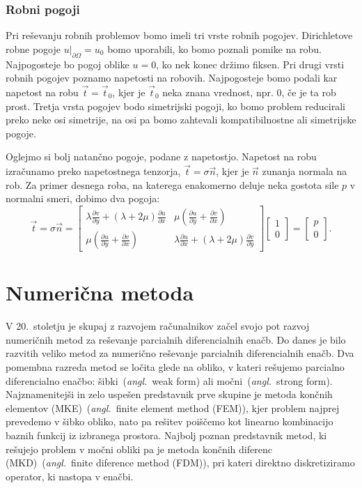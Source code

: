 \documentclass[12pt,a4paper,twoside]{article}
\theoremstyle{definition} %
\theoremstyle{plain} %
\numberwithin{equation}{section}
\newcommand{\dpar}[2]{\ensuremath{\frac{\partial #1}{\partial #2}}}
\newcommand{\vt}{\vec{t}}
\newcommand{\vn}{\vec{n}}
\newcommand{\ts}{\sigma}
\newcommand{\ang}[1]{(\textit{angl.}\ #1)}
\begin{document}
\subsubsection{Robni pogoji}
Pri reševanju robnih problemov bomo imeli tri vrste robnih pogojev. Dirichletove
robne pogoje $u|_{\partial \Omega} = u_0$ bomo uporabili, ko bomo poznali
pomike na robu. Najpogosteje bo pogoj oblike $u = 0$, ko nek konec držimo
fiksen. Pri drugi vrsti robnih pogojev poznamo napetosti na robovih.
Najpogosteje bomo podali kar napetost na robu $\vt = \vt_0$, kjer je $\vt_0$
neka znana vrednost, npr. 0, če je ta rob prost. Tretja vrsta pogojev bodo
simetrijski pogoji, ko bomo problem reducirali preko neke osi simetrije, na osi
pa bomo zahtevali kompatibilnostne ali simetrijske pogoje.

Oglejmo si bolj natančno pogoje, podane z napetostjo. Napetost na robu
izračunamo preko napetostnega tenzorja, $\vt = \ts\vn$, kjer je $\vn$ zunanja
normala na rob. Za primer desnega roba, na katerega enakomerno deluje neka gostota
sile $p$ v normalni smeri, dobimo dva pogoja:
\[
   \vt = \ts\vn =
  \begin{bmatrix}
    \lambda \dpar{v}{y} + (\lambda+2\mu) \dpar{u}{x} &
    \mu(\dpar{u}{y} + \dpar{v}{x}) \\
    \mu(\dpar{u}{y} + \dpar{v}{x}) &
    \lambda \dpar{u}{x} + (\lambda+2\mu) \dpar{v}{y}
  \end{bmatrix}
  \begin{bmatrix}
    1 \\ 0
  \end{bmatrix}
  =
  \begin{bmatrix}
    p \\ 0
  \end{bmatrix}.
\]

\section{Numerična metoda}
\label{sec:numericna-metoda}

V 20.~stoletju je skupaj z razvojem računalnikov začel svojo pot razvoj numeričnih
metod za reševanje parcialnih diferencialnih enačb. Do danes je bilo razvitih
veliko metod za numerično reševanje parcialnih diferencialnih enačb. Dva
pomembna razreda metod se ločita glede na obliko, v kateri rešujemo parcialno
diferencialno enačbo: šibki~\ang{weak form} ali močni~\ang{strong form}.
Najznamenitejši in zelo uspešen predstavnik prve skupine je metoda končnih
elementov (MKE)~\ang{finite element method (FEM)}, kjer problem najprej prevedemo
v šibko obliko, nato pa rešitev poiščemo kot linearno kombinacijo baznih
funkcij iz izbranega prostora. Najbolj poznan predstavnik metod, ki rešujejo
problem v močni obliki pa je metoda končnih diferenc (MKD)~\ang{finite diference
method (FDM)}, pri kateri direktno diskretiziramo operator, ki nastopa v enačbi.
\end{document}

